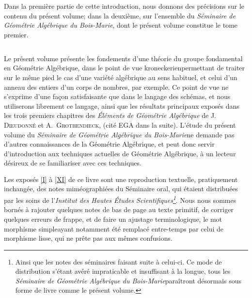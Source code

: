 Dans la premi\`ere partie de cette introduction, nous donnons des
pr\'ecisions sur le contenu du pr\'esent volume; dans la
deuxi\`eme, sur l'ensemble du \og \emph{Séminaire de
Géométrie Algébrique du Bois-Marie}\fg, dont le pr\'esent
volume constitue le tome premier.

\let\oldthesubsection\thesubsection
\def\thesubsection{\arabic{subsection}}
\subsection{}
\label{I.introduction.1}
Le pr\'esent volume pr\'esente les fondements d'une
th\'eorie du groupe fondamental en G\'eom\'etrie Alg\'ebrique,
dans le point de vue \og kroneckerien\fg permettant de traiter sur le
m\^eme pied le cas d'une vari\'et\'e alg\'ebrique au sens
habituel, et celui d'un anneau des entiers d'un corps de nombres, par
exemple. Ce point de vue ne s'exprime d'une fa\c con satisfaisante
que dans le langage des sch\'emas, et nous utiliserons librement ce
langage, ainsi que les r\'esultats principaux expos\'es dans les
trois premiers chapitres des \emph{Éléments de Géométrie
Algébrique} de J.\, \textsc{Dieudonné} et A.\, \textsc{Grothendieck}, (cit\'e EGA dans
la suite). L'\'etude du pr\'esent volume du \og \emph{Séminaire
de Géométrie Algébrique du Bois-Marie}\fg ne demande pas
d'autres connaissances de la G\'eom\'etrie Alg\'ebrique, et peut
donc servir d'introduction aux techniques actuelles de
G\'eom\'etrie Alg\'ebrique, \`a un lecteur d\'esireux de se
familiariser avec ces techniques.

Les expos\'es \ref{I} \`a \ref{XI} de ce livre sont une reproduction
textuelle, pratiquement inchang\'ee, des notes
mim\'eographi\'ees du S\'eminaire oral, qui \'etaient
distribu\'ees par les soins de l'\emph{Institut des Hautes Études
Scientifiques\footnote{Ainsi que les notes des séminaires faisant
suite à celui-ci. Ce mode de distribution s'étant
avéré impraticable et insuffisant à la longue, tous les
\og \emph{Séminaire de Géométrie Algébrique du
Bois-Marie}\fg paraîtront désormais sous forme de livre comme
le présent volume.}}. Nous nous sommes born\'es \`a rajouter
quelques notes de bas de page au texte primitif, de corriger quelques
erreurs de frappe, et de faire un ajustage terminologique, le mot
\og morphisme simple\fg ayant notamment \'et\'e remplac\'e
entre-temps par celui de \og morphisme lisse\fg, qui ne pr\^ete pas aux
m\^emes confusions.

